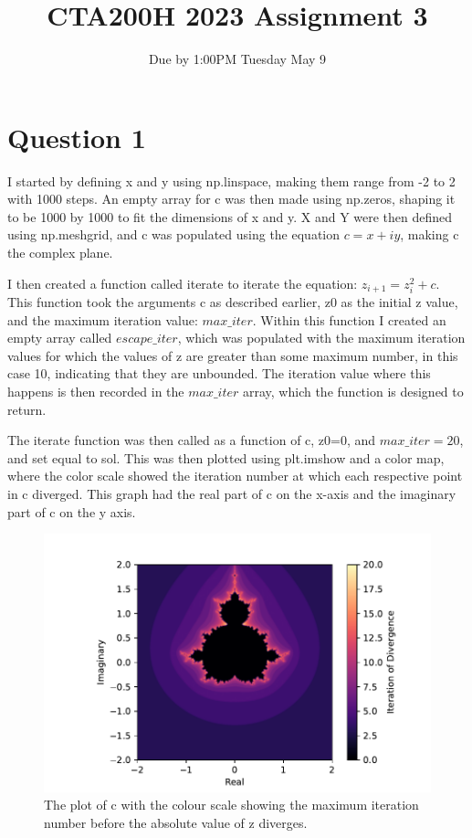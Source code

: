 \documentclass{article}
\title{CTA200H 2023 Assignment 3}
\author{Due by 1:00PM Tuesday May 9}
\date{}
\begin{document}
\maketitle

\section*{Question 1}
I started by defining x and y using np.linspace, making them range from -2 to 2 with 1000 steps. An empty array for c was then made using np.zeros, shaping it to be 1000 by 1000 to fit the dimensions of x and y. X and Y were then defined using np.meshgrid, and c was populated using the equation $c = x + iy$, making c the complex plane.

I then created a function called iterate to iterate the equation: $z_{i + 1} = z_i^2 + c$. This function took the arguments c as described earlier, z0 as the initial z value, and the maximum iteration value: $max \_ iter$. Within this function I created an empty array called $escape \_ iter$, which was populated with the maximum iteration values for which the values of z are greater than some maximum number, in this case 10, indicating that they are unbounded. The iteration value where this happens is then recorded in the $max \_ iter$ array, which the function is designed to return.

The iterate function was then called as a function of c, z0=0, and $max \_ iter=20$, and set equal to sol. This was then plotted using plt.imshow and a color map, where the color scale showed the iteration number at which each respective point in c diverged. This graph had the real part of c on the x-axis and the imaginary part of c on the y axis.  

\begin{figure}
\includegraphics{Q1_2.pdf}
\caption{The plot of c with the colour scale showing the maximum iteration number before the absolute value of z diverges.\vspace{3mm}}
\label{fig:Question1_2}
\end{figure}
\end{document}
